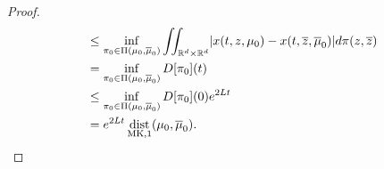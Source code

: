 \begin{proof}
\begin{align*}
                                                      &\le  \inf_{\pi_0 \in \Pi(\mu_0,\overline{\mu }_0) } \iint_{\mathbb{R}^{d} \times  \mathbb{R}^{d}  } \lvert x(t,z,\mu_0)-x(t,\overline{z},\overline{\mu }_0)  \rvert d\pi(z,\overline{z} )\\
                                                      &=  \inf_{\pi_0 \in \Pi(\mu_0,\overline{\mu }_0) } D[\pi_0] (t)\\
                                                      &\le \inf_{\pi_0 \in  \Pi(\mu_0,\overline{\mu }_0 )}D[\pi_0](0) e^{2Lt} \\
                                                      &= e^{2Lt} \operatorname*{dist}_{\text{MK},1}(\mu_0,\overline{\mu }_0 )
.\end{align*}
\end{proof}



